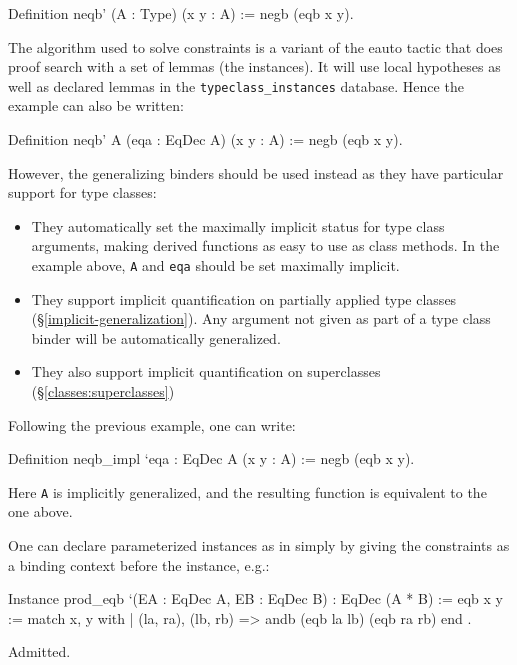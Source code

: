 \begin{coq_example}
Definition neqb' (A : Type) (x y : A) := negb (eqb x y).
\end{coq_example}

The algorithm used to solve constraints is a variant of the eauto tactic
that does proof search with a set of lemmas (the instances). It will use
local hypotheses as well as declared lemmas in the
\texttt{typeclass\_instances} database. Hence the example can also be
written:

\begin{coq_example}
Definition neqb' A (eqa : EqDec A) (x y : A) := negb (eqb x y).
\end{coq_example}

However, the generalizing binders should be used instead as they have
particular support for type classes:
\begin{itemize}
\item They automatically set the maximally implicit status for type
  class arguments, making derived functions as easy to use as class
  methods. In the example above, \texttt{A} and \texttt{eqa} should be
  set maximally implicit.
\item They support implicit quantification on partially applied type
  classes (\S \ref{implicit-generalization}).
  Any argument not given as part of a type class binder will be
  automatically generalized.
\item They also support implicit quantification on superclasses
  (\S \ref{classes:superclasses})
\end{itemize}

Following the previous example, one can write:
\begin{coq_example}
Definition neqb_impl `{eqa : EqDec A} (x y : A) := negb (eqb x y).
\end{coq_example}

Here \texttt{A} is implicitly generalized, and the resulting function
is equivalent to the one above.


One can declare parameterized instances as in \Haskell simply by giving
the constraints as a binding context before the instance, e.g.:

\begin{coq_example}
Instance prod_eqb `(EA : EqDec A, EB : EqDec B) : EqDec (A * B) :=
{ eqb x y := match x, y with
  | (la, ra), (lb, rb) => andb (eqb la lb) (eqb ra rb)
  end }.
\end{coq_example}
\begin{coq_eval}
Admitted.
\end{coq_eval}

